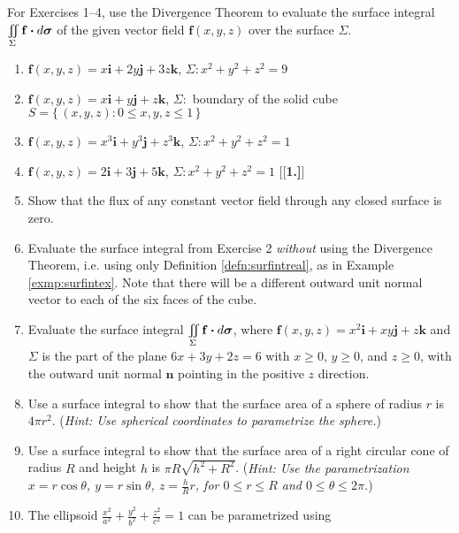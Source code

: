\startexercises\label{sec4dot4}
\par\noindent For Exercises 1--4, use the Divergence Theorem to evaluate the surface integral
$\iint\limits_{\Sigma} \mathbf{f} \bm{\cdot} d\bm{\sigma}$ of the given vector field $\mathbf{f}(x,y,z)$ over the
surface $\Sigma$.
\begin{enumerate}[\bfseries 1.]
 \item $\mathbf{f}(x,y,z) = x\mathbf{i} + 2y\mathbf{j} + 3z\mathbf{k}$, $\Sigma: x^2 + y^2 + z^2 = 9$
 \item $\mathbf{f}(x,y,z) = x\mathbf{i} + y\mathbf{j} + z\mathbf{k}$, $\Sigma:$ boundary of the solid cube
  $S = \lbrace\, (x,y,z): 0 \le x,y,z \le 1 \,\rbrace$
 \item $\mathbf{f}(x,y,z) = x^3\mathbf{i} + y^3\mathbf{j} + z^3\mathbf{k}$, $\Sigma: x^2 + y^2 + z^2 = 1$
 \item $\mathbf{f}(x,y,z) = 2\mathbf{i} + 3\mathbf{j} + 5\mathbf{k}$, $\Sigma: x^2 + y^2 + z^2 = 1$
[{[\bfseries 1.]}]
 \item Show that the flux of any constant vector field through any closed surface is zero.
 \item Evaluate the surface integral from Exercise 2 \emph{without} using the Divergence Theorem, i.e. using only
  Definition \ref{defn:surfintreal}, as in Example \ref{exmp:surfintex}. Note that there will be a different
  outward unit normal vector to each of the six faces of the cube.
 \item Evaluate the surface integral $\iint\limits_{\Sigma} \mathbf{f} \bm{\cdot} d\bm{\sigma}$, where
  $\mathbf{f}(x,y,z) = x^2 \mathbf{i} + xy\mathbf{j} + z\mathbf{k}$ and $\Sigma$ is the part of the plane $6x+3y+2z=6$
  with $x \ge 0$, $y \ge 0$, and $z \ge 0$, with the outward unit normal $\mathbf{n}$ pointing in the positive $z$
  direction.
 \item Use a surface integral to show that the surface area of a sphere of radius $r$ is $4\pi r^2$. (\emph{Hint: Use
  spherical coordinates to parametrize the sphere.})
 \item Use a surface integral to show that the surface area of a right circular cone of radius $R$ and height $h$ is
  $\pi R \sqrt{h^2 + R^2}$. (\emph{Hint: Use the parametrization $x=r\cos\theta$, $y=r\sin\theta$, $z=\frac{h}{R}r$,
  for $0 \le r \le R$ and $0 \le \theta \le 2\pi$.})
 \item The ellipsoid $\frac{x^2}{a^2}+\frac{y^2}{b^2}+\frac{z^2}{c^2}=1$ can be parametrized using

\end{enumerate}
